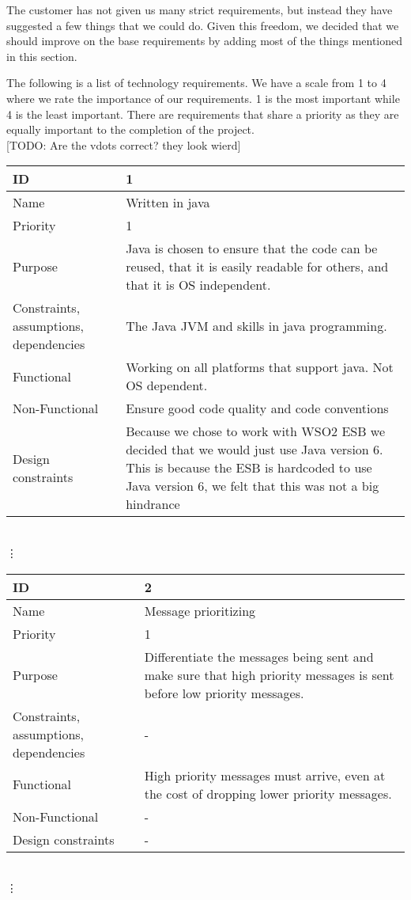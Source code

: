     The customer has not given us many strict requirements, but instead they have suggested a few things that we could do. Given this freedom, we decided that we should improve on the base requirements by adding most of the things mentioned in this section. 

    The following is a list of technology requirements. We have a scale from 1 to 4 where we rate the importance of our requirements. 1 is the most important while 4 is the least important. There are requirements that share a priority as they are equally important to the completion of the project. \\

[TODO: Are the vdots correct? they look wierd]

\begin{tabular}{| p{4cm} | p{8cm} |}
    \hline
    ID & 1 \\
    \hline
    Name & Written in java  \\
    \hline
    Priority & 1 \\
    \hline
    Purpose & Java is chosen to ensure that the code can be reused, that it is easily readable for others, and that it is OS independent. \\
    \hline 
    Constraints, assumptions, dependencies & The Java JVM and skills in java programming. \\
    \hline  
    Functional & Working on all platforms that support java. Not OS dependent. \\
    \hline
    Non-Functional & Ensure good code quality and code conventions \\ 
    \hline
    Design constraints & Because we chose to work with WSO2 ESB we decided that we would just use Java version 6. This is because the ESB is hardcoded to use Java version 6, we felt that this was not a big hindrance  \\
    \hline
\end{tabular}
\\  \vdots  \\

\begin{tabular}{| p{4cm} | p{8cm} |}
    \hline
    ID & 2 \\
    \hline
    Name & Message prioritizing \\
    \hline
    Priority & 1 \\
    \hline
    Purpose & Differentiate the messages being sent and make sure that high priority messages is sent before low priority messages. \\
    \hline 
    Constraints, assumptions, dependencies & -\\
    \hline  
    Functional & High priority messages must arrive, even at the cost of dropping lower priority messages.  \\
    \hline
    Non-Functional & - \\ 
    \hline
    Design constraints & - \\
    \hline
\end{tabular}
\\  \vdots  \\

